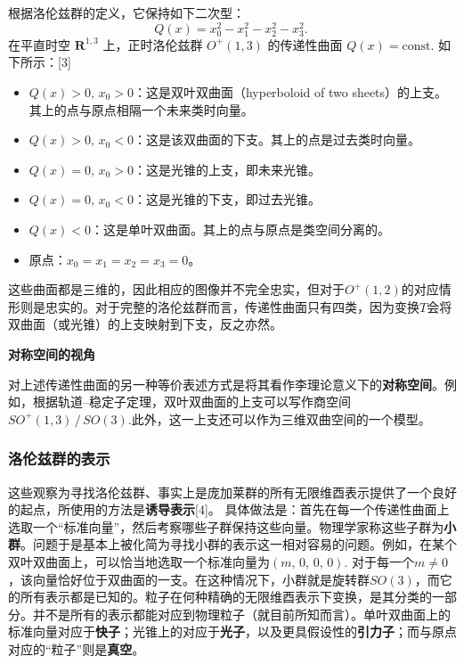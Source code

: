 根据洛伦兹群的定义，它保持如下二次型：
\[
Q(x) = x_{0}^{2} - x_{1}^{2} - x_{2}^{2} - x_{3}^{2}.~
\]
在平直时空 $\mathbf{R}^{1,3}$ 上，正时洛伦兹群 $O^{+}(1,3)$ 的传递性曲面 $Q(x)=\text{const.}$ 如下所示：[3]
\begin{itemize}
  \item $Q(x) > 0,\, x_{0} > 0$：这是双叶双曲面（hyperboloid of two sheets）的上支。其上的点与原点相隔一个未来类时向量。
  \item $Q(x) > 0,\, x_{0} < 0$：这是该双曲面的下支。其上的点是过去类时向量。
  \item $Q(x) = 0,\, x_{0} > 0$：这是光锥的上支，即未来光锥。
  \item $Q(x) = 0,\, x_{0} < 0$：这是光锥的下支，即过去光锥。
  \item $Q(x) < 0$：这是单叶双曲面。其上的点与原点是类空间分离的。
  \item 原点：$x_{0} = x_{1} = x_{2} = x_{3} = 0$。
\end{itemize}
这些曲面都是三维的，因此相应的图像并不完全忠实，但对于$O^{+}(1,2)$的对应情形则是忠实的。对于完整的洛伦兹群而言，传递性曲面只有四类，因为变换$T$会将双曲面（或光锥）的上支映射到下支，反之亦然。

\textbf{对称空间的视角}

对上述传递性曲面的另一种等价表述方式是将其看作李理论意义下的\textbf{对称空间}。例如，根据轨道–稳定子定理，双叶双曲面的上支可以写作商空间$SO^{+}(1,3) \,/\, SO(3)$.此外，这一上支还可以作为三维双曲空间的一个模型。
\subsubsection{洛伦兹群的表示}
这些观察为寻找洛伦兹群、事实上是庞加莱群的所有无限维酉表示提供了一个良好的起点，所使用的方法是\textbf{诱导表示}[4]。  具体做法是：首先在每一个传递性曲面上选取一个“标准向量”，然后考察哪些子群保持这些向量。物理学家称这些子群为\textbf{小群}。问题于是基本上被化简为寻找小群的表示这一相对容易的问题。例如，在某个双叶双曲面上，可以恰当地选取一个标准向量为$(m,\, 0,\, 0,\, 0)$.
对于每一个$m \neq 0$，该向量恰好位于双曲面的一支。在这种情况下，小群就是旋转群$SO(3)$，而它的所有表示都是已知的。粒子在何种精确的无限维酉表示下变换，是其分类的一部分。并不是所有的表示都能对应到物理粒子（就目前所知而言）。单叶双曲面上的标准向量对应于\textbf{快子}；光锥上的对应于\textbf{光子}，以及更具假设性的\textbf{引力子}；而与原点对应的“粒子”则是\textbf{真空}。
